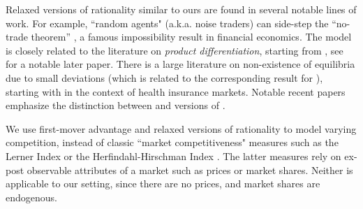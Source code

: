 Relaxed versions of rationality similar to ours are found in several notable lines of work. For example, ``random agents" (a.k.a. noise traders) can side-step the ``no-trade theorem'' \citep{Milgrom-Stokey-82}, a famous impossibility result in financial economics. The \SoftMaxRandom model is closely related to the literature on \emph{product differentiation}, starting from \cite{Hotelling-29}, see \cite{Perloff-Salop-85} for a notable later paper. There is a large literature on non-existence of equilibria due to small deviations   (which is related to the corresponding result for \HardMaxRandom), starting with \cite{Rothschild-Stiglitz-76} in the context of health insurance markets. Notable recent papers \citep{Veiga-Weyl-16,Azevedo-Gottlieb-17} emphasize the distinction between \HardMax and versions of \SoftMaxRandom.

We use first-mover advantage and relaxed versions of rationality to model varying competition, instead of classic ``market competitiveness" measures such as the Lerner Index or the Herfindahl-Hirschman Index
\citep{tirole1988theory}. The latter measures rely on ex-post observable attributes of a market such as prices or market shares. Neither is applicable to our setting, since there are no prices, and market shares are endogenous.




